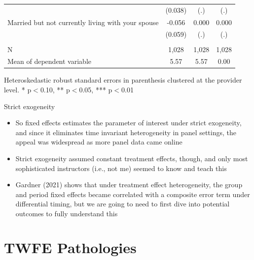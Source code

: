 \documentclass{beamer}
\begin{document}
\begin{frame}[plain]
\begin{table}[htbp]
\begin{center}
\begin{threeparttable}
\begin{tabular}{l*{3}{c}}
                    									&     (0.038)   &         (.)   &         (.) \\
Married but not currently living with your spouse	&      -0.056   &       0.000   &       0.000 \\
                    									&     (0.059)   &         (.)   &         (.) \\
\\
N                   									&       1,028   &       1,028   &       1,028\\
Mean of dependent variable								&        5.57   &        5.57   &        0.00\\
\bottomrule
\end{tabular}
\begin{tablenotes}
\tiny
\item Heteroskedastic robust standard errors in parenthesis clustered at the provider level. * p$<$0.10, ** p$<$0.05, *** p$<$0.01
\end{tablenotes}
\end{threeparttable}
\end{center}
\end{table}

\end{frame}


\begin{frame}{Strict exogeneity}

\begin{itemize}
\item So fixed effects estimates the parameter of interest under strict exogeneity, and since it eliminates time invariant heterogeneity in panel settings, the appeal was widespread as more panel data came online
\item Strict exogeneity assumed constant treatment effects, though, and only most sophisticated instructors (i.e., not me) seemed to know and teach this
\item Gardner (2021) shows that under treatment effect heterogeneity, the group and period fixed effects became correlated with a composite error term  under differential timing, but we are going to need to first dive into potential outcomes to fully understand this
\end{itemize}

\end{frame}




\section{TWFE Pathologies}
\end{document}
